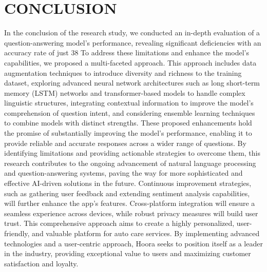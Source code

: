 \documentclass[conference]{IEEEtran}
\begin{document}
\section{CONCLUSION}
In the conclusion of the research study, we conducted an in-depth evaluation of a question-answering model's performance, revealing significant deficiencies with an accuracy rate of just 38%
To address these limitations and enhance the model's capabilities, we proposed a multi-faceted approach. This approach includes data augmentation techniques to introduce diversity and richness to the training dataset, exploring advanced neural network architectures such as long short-term memory (LSTM) networks and transformer-based models to handle complex linguistic structures, integrating contextual information to improve the model's comprehension of question intent, and considering ensemble learning techniques to combine models with distinct strengths.
These proposed enhancements hold the promise of substantially improving the model's performance, enabling it to provide reliable and accurate responses across a wider range of questions. By identifying limitations and providing actionable strategies to overcome them, this research contributes to the ongoing advancement of natural language processing and question-answering systems, paving the way for more sophisticated and effective AI-driven solutions in the future.
Continuous improvement strategies, such as gathering user feedback and extending sentiment analysis capabilities, will further enhance the app's features. Cross-platform integration will ensure a seamless experience across devices, while robust privacy measures will build user trust. This comprehensive approach aims to create a highly personalized, user-friendly, and valuable platform for auto care services. By implementing advanced technologies and a user-centric approach, Hoora seeks to position itself as a leader in the industry, providing exceptional value to users and maximizing customer satisfaction and loyalty.
\end{document}
